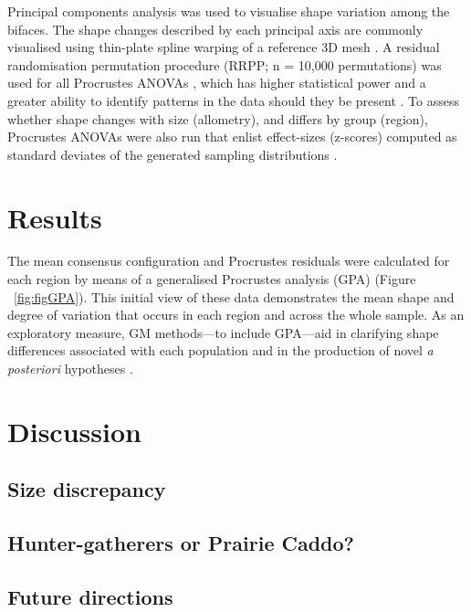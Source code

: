 \documentclass[review]{elsarticle}
\begin{document}
Principal components analysis \citep{RN1746} was used to visualise shape variation among the bifaces. The shape changes described by each principal axis are commonly visualised using thin-plate spline warping of a reference 3D mesh \citep{RN1731,RN479}. A residual randomisation permutation procedure (RRPP; n = 10,000 permutations) was used for all Procrustes ANOVAs \citep{RN1655,RN11775}, which has higher statistical power and a greater ability to identify patterns in the data should they be present \citep{RN1719}. To assess whether shape changes with size (allometry), and differs by group (region), Procrustes ANOVAs \citep{RN1749} were also run that enlist effect-sizes (z-scores) computed as standard deviates of the generated sampling distributions \citep{RN1756}. 

\section*{Results}

The mean consensus configuration and Procrustes residuals were calculated for each region by means of a generalised Procrustes analysis (GPA) \citep[Figure 3]{RN1720} (Figure ~\ref{fig:figGPA}). This initial view of these data demonstrates the mean shape and degree of variation that occurs in each region and across the whole sample. As an exploratory measure, GM methods---to include GPA---aid in clarifying shape differences associated with each population and in the production of novel \textit{a posteriori} hypotheses \citep{RN1720}.

\section*{Discussion}



\subsection*{Size discrepancy}



\subsection*{Hunter-gatherers or Prairie Caddo?}



\subsection*{Future directions}
\end{document}
